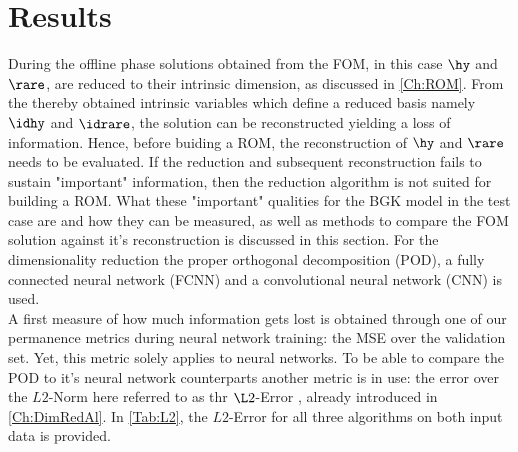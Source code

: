 
\chapter{Results}
\label{Results}

During the offline phase solutions obtained from the FOM, in this case $\hy$ and $\rare$, are reduced to their intrinsic dimension, as discussed in \cref{Ch:ROM}. From the thereby obtained intrinsic variables which define a reduced basis namely $\idhy$ and $\idrare$, the solution can be reconstructed yielding a loss of information. Hence, before buiding a ROM, the reconstruction of $\hy$ and $\rare$ needs to be evaluated. If the reduction and subsequent reconstruction fails to sustain "important" information, then the reduction algorithm is not suited for building a ROM. What these "important" qualities for the BGK model in the test case are and how they can be measured, as well as methods to compare the FOM solution against it's reconstruction is discussed in this section. For the dimensionality reduction the proper orthogonal decomposition (POD), a fully connected neural network (FCNN) and a convolutional neural network (CNN) is used.\\

A first measure of how much information gets lost is obtained through one of our permanence metrics during neural network training: the MSE over the validation set. Yet, this metric solely applies to neural networks. To be able to compare the POD to it's neural network counterparts another metric is in use: the error over the $L2$-Norm here referred to as thr $\L2$-Error , already introduced in \cref{Ch:DimRedAl}. In \cref{Tab:L2}, the $L2$-Error for all three algorithms on both input data is provided.

